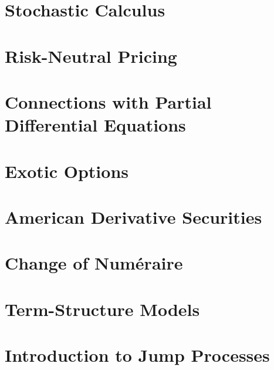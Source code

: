 \documentclass{article}
\begin{document}
\section{Stochastic Calculus}
\section{Risk-Neutral Pricing}
\section{Connections with Partial Differential Equations}
\section{Exotic Options}
\section{American Derivative Securities}
\section{Change of Numéraire}
\section{Term-Structure Models}
\section{Introduction to Jump Processes}
\end{document}
